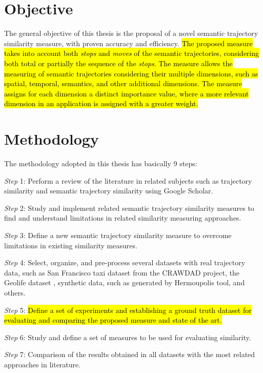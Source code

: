 \section{Objective}

The general objective of this thesis is the proposal of a novel semantic trajectory similarity measure, with proven accuracy and efficiency. \hl{The proposed measure takes into account both \emph{stops} and \emph{moves} of the semantic trajectories, considering both total or partially the sequence of the \emph{stops}. The measure allows the measuring of semantic trajectories considering their multiple dimensions, such as spatial, temporal, semantics, and other additional dimensions. The measure assigns for each dimension a distinct importance value, where a more relevant dimension in an application is assigned with a greater weight.}

\section{Methodology}
The methodology adopted in this thesis has basically 9 steps:

\textit{Step} 1: Perform a review of the literature in related subjects such as trajectory similarity and semantic trajectory similarity using Google Scholar.

\textit{Step} 2: Study and implement related semantic trajectory similarity measures to find and understand limitations in related similarity measuring approaches.

\textit{Step} 3: Define a new semantic trajectory similarity measure to overcome limitations in existing similarity measures.

\textit{Step} 4: Select, organize, and pre-process several datasets with real trajectory data, such as San Francisco taxi dataset from the CRAWDAD project\cite{epfl-mobility-20090224}, the Geolife dataset \cite{zheng2009mining},  synthetic data, such as generated by Hermoupolis tool\cite{Pelekis-Hermoupolis}, and others.

\textit{Step} 5: \hl{Define a set of experiments and establishing a ground truth dataset for evaluating and comparing the proposed measure and state of the art.}

\textit{Step} 6: Study and define a set of measures to be used for evaluating similarity.

\textit{Step} 7: Comparison of the results obtained in all datasets with the most related approaches in literature.

